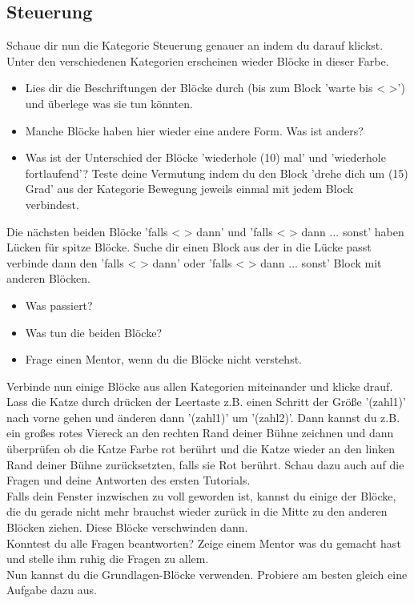 \documentclass{\VorlagenPfad/coderdojokatext}
\begin{document}
\subsection{Steuerung}
Schaue dir nun die Kategorie \textcolor{Ste}{Steuerung} genauer an indem du darauf klickst. Unter den verschiedenen Kategorien erscheinen wieder Blöcke in dieser \textcolor{Ste}{Farbe}.
\begin{itemize}
\item Lies dir die Beschriftungen der Blöcke durch (bis zum Block \textcolor{Ste}{'warte bis < >'}) und überlege was sie tun könnten.
\item Manche Blöcke haben hier wieder eine andere Form. Was ist anders?
\item Was ist der Unterschied der Blöcke \textcolor{Ste}{'wiederhole (10) mal'} und \textcolor{Ste}{'wiederhole fortlaufend'}? Teste deine Vermutung indem du den Block \textcolor{Bew}{'drehe dich um (15) Grad'} aus der Kategorie \textcolor{Bew}{Bewegung} jeweils einmal mit jedem Block verbindest.
\newline
\end{itemize}
Die nächsten beiden Blöcke \textcolor{Ste}{'falls <  > dann'} und \textcolor{Ste}{'falls <  > dann ... sonst'} haben Lücken für spitze Blöcke. Suche dir einen Block aus der in die Lücke passt verbinde dann den \textcolor{Ste}{'falls <  > dann'} oder \textcolor{Ste}{'falls <  > dann ... sonst'} Block mit anderen Blöcken.
\begin{itemize}
\item Was passiert? 
\item Was tun die beiden Blöcke?
\item Frage einen Mentor, wenn du die Blöcke nicht verstehst.
\newline
\end{itemize}

Verbinde nun einige Blöcke aus allen Kategorien miteinander und klicke drauf. Lass die Katze durch drücken der Leertaste z.B. einen Schritt der Größe \textcolor{Spe}{'(zahl1)'} nach vorne gehen und änderen dann  \textcolor{Spe}{'(zahl1)'} um \textcolor{Spe}{'(zahl2)'}. Dann kannst du z.B. ein großes rotes Viereck an den rechten Rand deiner Bühne zeichnen und dann überprüfen ob die Katze Farbe rot berührt und die Katze wieder an den linken Rand deiner Bühne zurücksetzten, falls sie Rot berührt. Schau dazu auch auf die Fragen und deine Antworten des ersten Tutorials. \\
\newline
Falls dein Fenster inzwischen zu voll geworden ist, kannst du einige der Blöcke, die du gerade nicht mehr brauchst wieder zurück in die Mitte zu den anderen Blöcken ziehen. Diese Blöcke verschwinden dann.\\
\newline
Konntest du alle Fragen beantworten? Zeige einem Mentor was du gemacht hast und stelle ihm ruhig die Fragen zu allem.\\
\newline
Nun kannst du die Grundlagen-Blöcke verwenden. Probiere am besten gleich eine Aufgabe dazu aus.
\end{document}
